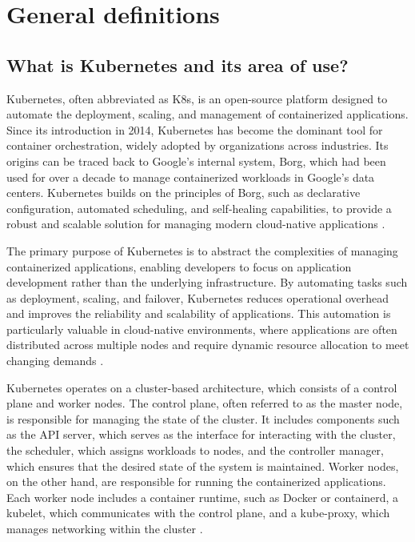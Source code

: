 

\section{General definitions} \label{cha:generalDefinitions}

\subsection{What is Kubernetes and its area of use?}

Kubernetes, often abbreviated as K8s, is an open-source platform designed to automate the deployment, scaling, and management of containerized applications. Since its introduction in 2014, Kubernetes has become the dominant tool for container orchestration, widely adopted by organizations across industries. Its origins can be traced back to Google’s internal system, Borg, which had been used for over a decade to manage containerized workloads in Google’s data centers. Kubernetes builds on the principles of Borg, such as declarative configuration, automated scheduling, and self-healing capabilities, to provide a robust and scalable solution for managing modern cloud-native applications \citeyear{rahman2023, deng2023}.

The primary purpose of Kubernetes is to abstract the complexities of managing containerized applications, enabling developers to focus on application development rather than the underlying infrastructure. By automating tasks such as deployment, scaling, and failover, Kubernetes reduces operational overhead and improves the reliability and scalability of applications. This automation is particularly valuable in cloud-native environments, where applications are often distributed across multiple nodes and require dynamic resource allocation to meet changing demands \citeyear{carrion2023, nadaf2022}.

Kubernetes operates on a cluster-based architecture, which consists of a control plane and worker nodes. The control plane, often referred to as the master node, is responsible for managing the state of the cluster. It includes components such as the API server, which serves as the interface for interacting with the cluster, the scheduler, which assigns workloads to nodes, and the controller manager, which ensures that the desired state of the system is maintained. Worker nodes, on the other hand, are responsible for running the containerized applications. Each worker node includes a container runtime, such as Docker or containerd, a kubelet, which communicates with the control plane, and a kube-proxy, which manages networking within the cluster \citeyear{nadaf2022}.

